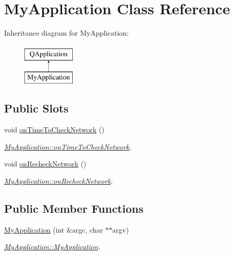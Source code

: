 \hypertarget{classMyApplication}{}\section{My\+Application Class Reference}
\label{classMyApplication}
Inheritance diagram for My\+Application\+:\begin{figure}[H]
\begin{center}
\leavevmode
\includegraphics[height=2.000000cm]{dc/d75/classMyApplication}
\end{center}
\end{figure}
\subsection*{Public Slots}
\begin{DoxyCompactItemize}
\item 
void \mbox{\hyperlink{classMyApplication_a75fa90701c6bd2d08c9c25a12776837a}{on\+Time\+To\+Check\+Network}} ()
\begin{DoxyCompactList}\small\item\em \mbox{\hyperlink{classMyApplication_a75fa90701c6bd2d08c9c25a12776837a}{My\+Application\+::on\+Time\+To\+Check\+Network}}. \end{DoxyCompactList}\item 
void \mbox{\hyperlink{classMyApplication_a5c8b62671675099c66b9e4cc887f69a5}{on\+Recheck\+Network}} ()
\begin{DoxyCompactList}\small\item\em \mbox{\hyperlink{classMyApplication_a5c8b62671675099c66b9e4cc887f69a5}{My\+Application\+::on\+Recheck\+Network}}. \end{DoxyCompactList}\end{DoxyCompactItemize}
\subsection*{Public Member Functions}
\begin{DoxyCompactItemize}
\item 
\mbox{\hyperlink{classMyApplication_a4b9e70ce40a83d5d4ae99253a6933c02}{My\+Application}} (int \&argc, char $\ast$$\ast$argv)
\begin{DoxyCompactList}\small\item\em \mbox{\hyperlink{classMyApplication_a4b9e70ce40a83d5d4ae99253a6933c02}{My\+Application\+::\+My\+Application}}. \end{DoxyCompactList}\end{DoxyCompactItemize}


